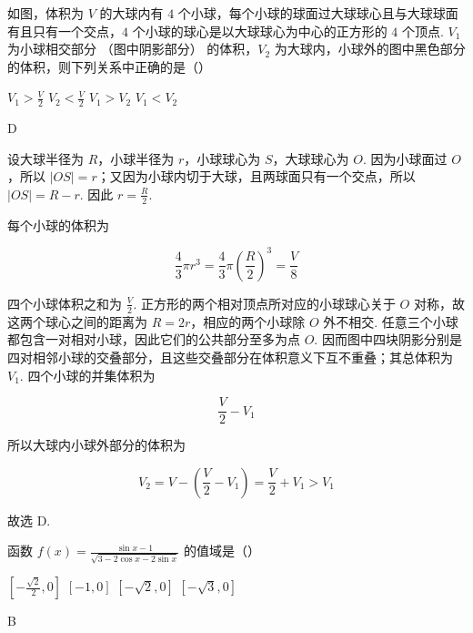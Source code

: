 \begin{problem}
如图，体积为 \(V\) 的大球内有 \(4\) 个小球，每个小球的球面过大球球心且与大球球面有且只有一个交点，\(4\) 个小球的球心是以大球球心为中心的正方形的 \(4\) 个顶点. \(V_{1}\) 为小球相交部分 （图中阴影部分） 的体积，\(V_{2}\) 为大球内，小球外的图中黑色部分的体积，则下列关系中正确的是（\quad）

\FloatBarrier

\choices
    {\(V_{1} > \frac{V}{2}\)}
    {\(V_{2} < \frac{V}{2}\)}
    {\(V_{1} > V_{2}\)}
    {\(V_{1} < V_{2}\)}
\end{problem}

\begin{answer}
D
\end{answer}

\begin{solution}
设大球半径为 \(R\)，小球半径为 \(r\)，小球球心为 \(S\)，大球球心为 \(O\). 因为小球面过 \(O\)，所以 \(|OS|=r\)；又因为小球内切于大球，且两球面只有一个交点，所以 \(|OS|=R-r\). 因此 \(r=\frac{R}{2}\).

每个小球的体积为

\[
\frac{4}{3}\pi r^{3}=\frac{4}{3}\pi\left(\frac{R}{2}\right)^{3}=\frac{V}{8}
\]

四个小球体积之和为 \(\frac{V}{2}\). 正方形的两个相对顶点所对应的小球球心关于 \(O\) 对称，故这两个球心之间的距离为 \(R=2r\)，相应的两个小球除 \(O\) 外不相交. 任意三个小球都包含一对相对小球，因此它们的公共部分至多为点 \(O\). 因而图中四块阴影分别是四对相邻小球的交叠部分，且这些交叠部分在体积意义下互不重叠；其总体积为 \(V_{1}\). 四个小球的并集体积为

\[
\frac{V}{2}-V_{1}
\]

所以大球内小球外部分的体积为

\[
V_{2}=V-\left(\frac{V}{2}-V_{1}\right)=\frac{V}{2}+V_{1}>V_{1}
\]

故选 D.
\end{solution}

\begin{problem}
函数 \( f(x) = \frac{\sin x - 1}{\sqrt{3 - 2\cos x - 2\sin x}} \) 的值域是（\quad）

\choices
    {\( \left[-\frac{\sqrt{2}}{2},0\right] \)}
    {\([-1,0]\)}
    {\([- \sqrt{2}, 0]\)}
    {\([- \sqrt{3}, 0]\)}
\end{problem}

\begin{answer}
B
\end{answer}

